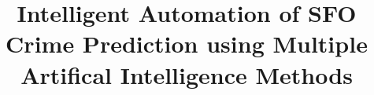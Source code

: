\documentclass[11 pt,conference,final,]{IEEEtran}
\begin{document}
%
\title{Intelligent Automation of SFO Crime Prediction using Multiple
Artifical Intelligence Methods}


\author{











}


%
\end{document}

